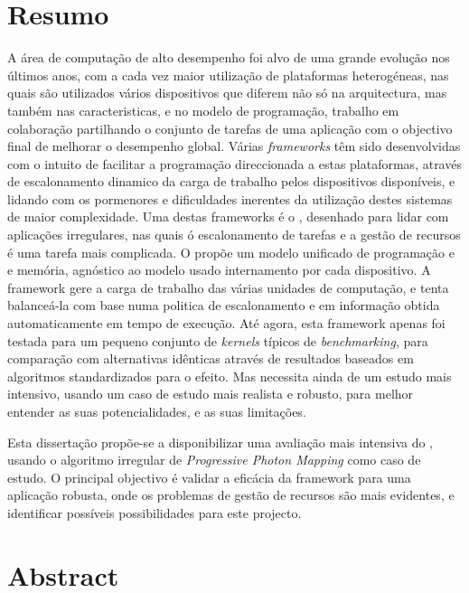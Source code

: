 \documentclass[main.tex]{subfiles}
\begin{document}
\chapter*{Resumo}

A área de computação de alto desempenho foi alvo de uma grande evolução nos últimos anos, com a cada vez maior utilização de plataformas heterogéneas, nas quais são utilizados vários dispositivos que diferem não só na arquitectura, mas também nas caracteristicas, e no modelo de programação, trabalho em colaboração partilhando o conjunto de tarefas de uma aplicação com o objectivo final de melhorar o desempenho global. Várias \textit{frameworks} têm sido desenvolvidas com o intuito de facilitar a programação direccionada a estas plataformas, através de escalonamento dinamico da carga de trabalho pelos dispositivos disponíveis, e lidando com os pormenores e dificuldades inerentes da utilização destes sistemas de maior complexidade. Uma destas frameworks é o \gama, desenhado para lidar com aplicações irregulares, nas quais ó escalonamento de tarefas e a gestão de recursos é uma tarefa mais complicada. O \gama propõe um modelo unificado de programação e e memória, agnóstico ao modelo usado internamento por cada dispositivo. A framework gere a carga de trabalho das várias unidades de computação, e tenta balanceá-la com base numa politica de escalonamento e em informação obtida automaticamente em tempo de execução. Até agora, esta framework apenas foi testada para um pequeno conjunto de \textit{kernels} típicos de \textit{benchmarking}, para comparação com alternativas idênticas através de resultados baseados em algoritmos standardizados para o efeito. Mas necessita ainda de um estudo mais intensivo, usando um caso de estudo mais realista e robusto, para melhor entender as suas potencialidades, e as suas limitações.

Esta dissertação propõe-se a disponibilizar uma avaliação mais intensiva do \gama, usando o algoritmo irregular de \textit{Progressive Photon Mapping} como caso de estudo. O principal objectivo é validar a eficácia da framework para uma aplicação robusta, onde os problemas de gestão de recursos são mais evidentes, e identificar possíveis possibilidades para este projecto.

\newpage {}
\chapter*{Abstract}
\end{document}
